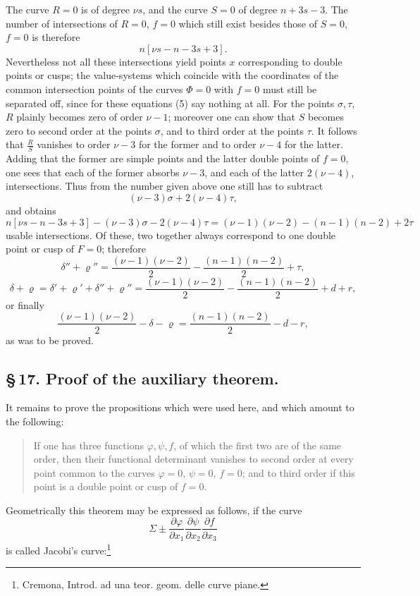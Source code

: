 \documentclass[10pt]{article}
\begin{document}
The curve \(R=0\) is of degree \(\nu s\), and the curve \(S=0\) of degree \(n+3s-3\). The number of intersections of \(R=0\), \(f=0\) which still exist besides those of \(S=0\), \(f=0\) is therefore
\[
n[\nu s-n-3s+3].
\]
Nevertheless not all these intersections yield points \(x\) corresponding to double points or cusps; the value-systems which coincide with the coordinates of the common intersection points of the curves \(\Phi=0\) with \(f=0\) must still be separated off, since for these equations (5) say nothing at all. For the points \(\sigma,\tau\), \(R\) plainly becomes zero of order \(\nu-1\); moreover one can show that \(S\) becomes zero to second order at the points \(\sigma\), and to third order at the points \(\tau\). It follows that \(\frac{R}{S}\) vanishes to order \(\nu-3\) for the former and to order \(\nu-4\) for the latter. Adding that the former are simple points and the latter double points of \(f=0\), one sees that each of the former absorbs \(\nu-3\), and each of the latter \(2(\nu-4)\), intersections. Thus from the number given above one still has to subtract
\[
(\nu-3)\sigma+2(\nu-4)\tau,
\]
and obtains
\[
n[\nu s-n-3s+3]-(\nu-3)\sigma-2(\nu-4)\tau
=(\nu-1)(\nu-2)-(n-1)(n-2)+2\tau
\]
usable intersections. Of these, two together always correspond to one double point or cusp of \(F=0\); therefore
\[
\delta''+\varrho''
=
\frac{(\nu-1)(\nu-2)}{2}
-\frac{(n-1)(n-2)}{2}
+\tau,
\]
\[
\delta+\varrho
=\delta'+\varrho'+\delta''+\varrho''
=
\frac{(\nu-1)(\nu-2)}{2}
-\frac{(n-1)(n-2)}{2}
+d+r,
\]
or finally
\[
\frac{(\nu-1)(\nu-2)}{2}-\delta-\varrho
=
\frac{(n-1)(n-2)}{2}-d-r,
\]
as was to be proved.

\subsection*{\S\,17. Proof of the auxiliary theorem.}

It remains to prove the propositions which were used here, and which amount to the following:

\begin{quote}
If one has three functions \(\varphi,\psi,f\), of which the first two are of the same order, then their functional determinant vanishes to second order at every point common to the curves \(\varphi=0\), \(\psi=0\), \(f=0\); and to third order if this point is a double point or cusp of \(f=0\).
\end{quote}

Geometrically this theorem may be expressed as follows, if the curve
\[
\Sigma\pm
\frac{\partial\varphi}{\partial x_1}
\frac{\partial\psi}{\partial x_2}
\frac{\partial f}{\partial x_3}
\]
is called Jacobi's curve:\footnote{Cremona, Introd. ad una teor. geom. delle curve piane.}
\end{document}
